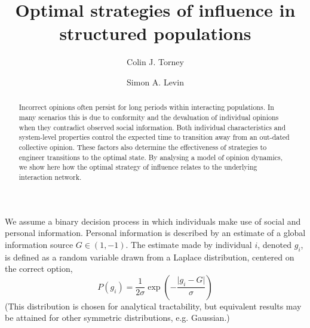 \documentclass[aps,prl,twocolumn,showpacs,superscriptaddress,groupedaddress]{revtex4}
\begin{document}
\title{Optimal strategies of influence in structured populations}
\author{Colin J. Torney}
\author{Simon A. Levin}

\begin{abstract}
Incorrect opinions often persist for long periods within interacting populations. In many scenarios this is due to conformity and the devaluation of individual opinions when they contradict observed social information. Both individual characteristics and system-level properties control the expected time to transition away from an out-dated collective opinion. These factors also determine the effectiveness of strategies to engineer transitions to the optimal state. By analysing a model of opinion dynamics, we show here how the optimal strategy of influence relates to the underlying interaction network. 
\end{abstract}
\maketitle

We assume a binary decision process in which individuals make use of social and personal information. Personal information is described by an estimate of a global information source $G\in(1,-1)$. The estimate made by individual $i$, denoted $g_i$, is defined as a random variable drawn from a Laplace distribution, centered on the correct option,
\begin{equation}
P(g_i) = \frac{1}{2\sigma} \exp{ \left( - \frac{\vert g_i - G \vert}{\sigma} \right)}
\label{lapdist}
\end{equation}
(This distribution is chosen for analytical tractability, but equivalent results may be attained for other symmetric distributions, e.g. Gaussian.)
\end{document}
